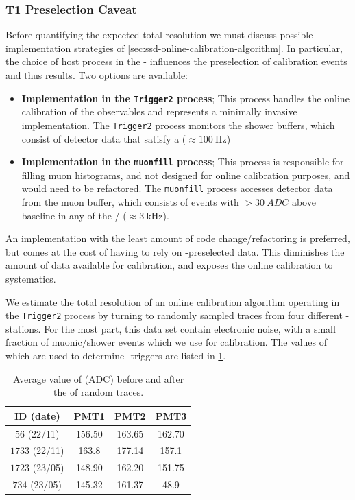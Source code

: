 \subsubsection{T1 Preselection Caveat}

Before quantifying the expected total resolution we must discuss possible
implementation strategies of \cref{sec:ssd-online-calibration-algorithm}. In
particular, the choice of host process in the \UUB-\DAQ 
\cite{satoUUBDAQV128r0b0p292024} influences the preselection of calibration 
events and thus results. Two options are available:

\begin{itemize}
\item \textbf{Implementation in the \texttt{Trigger2} process}; This process 
	handles the online calibration of the \WCD observables and represents a
	minimally invasive implementation. The \texttt{Trigger2} process 
	monitors the shower buffers, which consist of detector data that satisfy
	a \TONE ($\approx\SI{100}{\hertz}$)
\item \textbf{Implementation in the \texttt{muonfill} process}; This process 
	is responsible for filling muon histograms, and not designed for online 
	calibration purposes, and would need to be refactored. The 
	\texttt{muonfill} process accesses detector data from the muon buffer, 
	which consists of events with $>\SI{30}{ADC}$ above baseline in any of 
	the \SSD/\WCD-\PMTs ($\approx\SI{3}{\kilo\hertz}$).
\end{itemize}

An implementation with the least amount of code change/refactoring is preferred,
but comes at the cost of having to rely on \WCD-\TONE preselected data. This
diminishes the amount of data available for calibration, and exposes the \SSD
online calibration to \WCD systematics.

We estimate the total resolution of an \SSD online calibration algorithm 
operating in the \texttt{Trigger2} process by turning to randomly sampled \UUB 
traces from four different \SD-stations. For the most part, this data set 
contain electronic noise, with a small fraction of muonic/shower events which we
use for calibration. The values of \VemOnline which are used to determine 
\TONE-triggers are listed in \cref{tab:wcd-online_calibration-values}.

\begin{table}
    \centering
    \begin{tabular}{c|ccc}
         \toprule
         ID (date) & PMT1 & PMT2 & PMT3 \\
         \midrule
        $56$ (22/11) & 156.50 & 163.65 & 162.70 \\
        $1733$ (22/11) & 163.8 & 177.14 & 157.1 \\
        $1723$ (23/05) & 148.90 & 162.20 & 151.75 \\
        $734$ (23/05) & 145.32 & 161.37 & 48.9 \\
        \bottomrule
    \end{tabular}
    \caption{Average value of \VemOnline (ADC) before and 
    after the \DAQ of random traces.}
    \label{tab:wcd-online_calibration-values}
\end{table}

